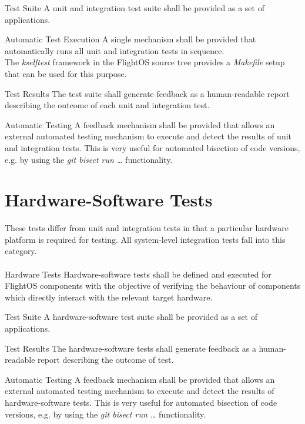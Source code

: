  {Test Suite}{%
A unit and integration test suite shall be provided as a set of applications.
}{}%

 {Automatic Test Execution}{%
A single mechanism shall be provided that automatically runs all unit and %
integration tests in sequence.\\
}{
The \emph{kselftest} framework in the FlightOS source tree provides a %
\emph{Makefile} setup that can be used for this purpose.}%

 {Test Results}{%
The test suite shall generate feedback as a human-readable report describing the %
outcome of each unit and integration test.%
}{}

 {Automatic Testing}{%
A feedback mechanism shall be provided that allows an external automated %
testing mechanism to execute and detect the results of unit and integration %
tests.%
}{This is very useful for automated bisection of code versions, e.g. by %
using the \emph{git bisect run \ldots} functionality.}%


\section {Hardware-Software Tests}

These tests differ from unit and integration tests in that a particular hardware
platform is required for testing. All system-level integration tests fall into
this category.\\
\\

 {Hardware Tests}{%
Hardware-software tests shall be defined and executed for FlightOS components %
with the objective of verifying the behaviour of components which directly %
interact with the relevant target hardware.%
}{}

 {Test Suite}{%
A hardware-software test suite shall be provided as a set of applications.
}{}

 {Test Results}{%
The hardware-software tests shall generate feedback as a human-readable %
report describing the outcome of test.%
}{}


 {Automatic Testing}{%
A feedback mechanism shall be provided that allows an external automated %
testing mechanism to execute and detect the results of hardware-software tests.%
}{This is very useful for automated bisection of code versions, e.g. by %
using the \emph{git bisect run \ldots} functionality.}%


